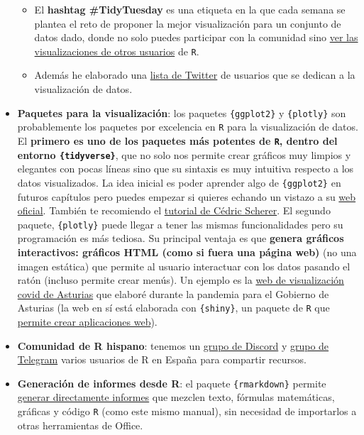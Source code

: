 \documentclass[11pt,]{book}
\providecommand{\tightlist}{%
  \setlength{\itemsep}{0pt}\setlength{\parskip}{0pt}}
\begin{document}
\begin{itemize}
  \begin{itemize}
  \tightlist
  \item
    El \textbf{hashtag \#TidyTuesday} es una etiqueta en la que cada semana se plantea el reto de proponer la mejor visualización para un conjunto de datos dado, donde no solo puedes participar con la comunidad sino \href{https://github.com/rfordatascience/tidytuesday}{ver las visualizaciones de otros usuarios} de \texttt{R}.
  \item
    Además he elaborado una \href{https://twitter.com/i/lists/1324478481338683392?s=20}{lista de Twitter} de usuarios que se dedican a la visualización de datos.
  \end{itemize}
\item
  \textbf{Paquetes para la visualización}: los paquetes \texttt{\{ggplot2\}} y \texttt{\{plotly\}} son probablemente los paquetes por excelencia en \texttt{R} para la visualización de datos. El \textbf{primero es uno de los paquetes más potentes de \texttt{R}, dentro del entorno \texttt{\{tidyverse\}}}, que no solo nos permite crear gráficos muy limpios y elegantes con pocas líneas sino que su sintaxis es muy intuitiva respecto a los datos visualizados. La idea inicial es poder aprender algo de \texttt{\{ggplot2\}} en futuros capítulos pero puedes empezar si quieres echando un vistazo a su \href{https://ggplot2.tidyverse.org/}{web oficial}. También te recomiendo el \href{https://www.cedricscherer.com/2019/08/05/a-ggplot2-tutorial-for-beautiful-plotting-in-r/}{tutorial de Cédric Scherer}. El segundo paquete, \texttt{\{plotly\}} puede llegar a tener las mismas funcionalidades pero su programación es más tediosa. Su principal ventaja es que \textbf{genera gráficos interactivos: gráficos HTML (como si fuera una página web)} (no una imagen estática) que permite al usuario interactuar con los datos pasando el ratón (incluso permite crear menús). Un ejemplo es la \href{https://dgspasturias.shinyapps.io/panel_de_indicadores_asturias/}{web de visualización covid de Asturias} que elaboré durante la pandemia para el Gobierno de Asturias (la web en sí está elaborada con \texttt{\{shiny\}}, un paquete de \texttt{R} que \href{https://shiny.rstudio.com/tutorial/}{permite crear aplicaciones web}).
\item
  \textbf{Comunidad de R hispano}: tenemos un \href{https://discord.gg/7ueKQqeaGr}{grupo de Discord} y \href{https://t.me/hispanoverse}{grupo de Telegram} varios usuarios de R en España para compartir recursos.
\item
  \textbf{Generación de informes desde R}: el paquete \texttt{\{rmarkdown\}} permite \href{https://rmarkdown.rstudio.com/}{generar directamente informes} que mezclen texto, fórmulas matemáticas, gráficas y código \texttt{R} (como este mismo manual), sin necesidad de importarlos a otras herramientas de Office.
\end{itemize}


\end{document}
